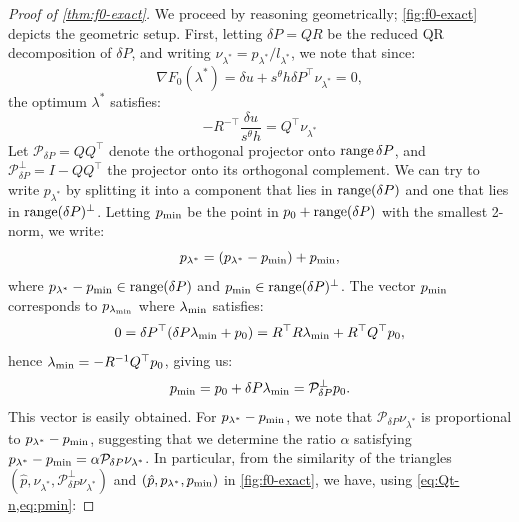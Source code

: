 \documentclass[sisc-eikonal.tex]{subfiles}
\begin{document}
\begin{proof}[Proof of \cref{thm:f0-exact}]
  We proceed by reasoning geometrically; \cref{fig:f0-exact} depicts
  the geometric setup. First, letting $\delta P = QR$ be the reduced
  QR decomposition of $\delta P$, and writing
  $\nu_{\lambda^*} = p_{\lambda^*}/l_{\lambda^*}$, we note that since:
  \begin{equation}
    \nabla F_0(\lambda^*) = \delta u + s^\theta h \delta P^\top \nu_{\lambda^*} = 0,
  \end{equation}
  the optimum $\lambda^*$ satisfies:
  \begin{equation}\label{eq:Qt-n}
    - R^{-\top} \frac{\delta u}{s^\theta h} = Q^\top \nu_{\lambda^*}
  \end{equation}
  Let $\mathcal{P}_{\delta P} = QQ^\top$ denote the orthogonal
  projector onto $\operatorname{range} \delta P$, and
  $\mathcal{P}^\perp_{\delta P} = I - QQ^\top$ the projector onto its
  orthogonal complement. We can try to write $p_{\lambda^*}$ by
  splitting it into a component that lies in $\operatorname{range}(\delta P)$ and
  one that lies in $\operatorname{range}(\delta P)^\perp$. Letting $p_{\operatorname{min}}$ be the
  point in $p_0 + \operatorname{range}(\delta P)$ with the smallest 2-norm, we
  write:
  \begin{equation}\label{eq:plam-decomp}
    p_{\lambda^*} = (p_{\lambda^*} - \pmin) + \pmin,
  \end{equation}
  where $p_{\lambda^*} - p_{\operatorname{min}} \in \operatorname{range}(\delta P)$ and
  $p_{\operatorname{min}} \in \operatorname{range}(\delta P)^\perp$. The vector $p_{\operatorname{min}}$ corresponds to
  $p_{\lambda_{\operatorname{min}}}$ where $\lambda_{\operatorname{min}}$ satisfies:
  \begin{equation}
    0 = \delta P^\top (\delta P \lambda_{\operatorname{min}} + p_0) = R^\top R \lambda_{\operatorname{min}} + R^\top Q^\top p_0,
  \end{equation}
  hence $\lambda_{\operatorname{min}} = -R^{-1} Q^\top p_0$, giving us:
  \begin{equation}\label{eq:pmin}
    \pmin = p_0 + \delta P \lambdamin = \mathcal{P}^\perp_{\delta P} p_0.
  \end{equation}
  This vector is easily obtained. For $p_{\lambda^*} - p_{\operatorname{min}}$, we note
  that $\mathcal{P}_{\delta P} \nu_{\lambda^*}$ is proportional to
  $p_{\lambda^*} - p_{\operatorname{min}}$, suggesting that we determine the ratio
  $\alpha$ satisfying
  $p_{\lambda^*} - p_{\operatorname{min}} = \alpha \mathcal{P}_{\delta P}
  \nu_{\lambda^*}$. In particular, from the similarity of the
  triangles
  $(\hat{p}, \nu_{\lambda^*}, \mathcal{P}^\perp_{\delta P}
  \nu_{\lambda^*})$ and $(\hat{p}, p_{\lambda^*}, p_{\operatorname{min}})$ in
  \cref{fig:f0-exact}, we have, using \cref{eq:Qt-n,eq:pmin}:

\end{proof}
\end{document}
